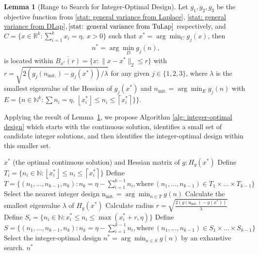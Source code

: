 \documentclass{article}
\theoremstyle{definition}
\newtheorem{lemma}[theorem]{Lemma}
\begin{document}
\begin{lemma}[Range to Search for Integer-Optimal Design] \label{lemma: range to search}
    Let $g_1, g_2, g_3$ be the objective function  from \eqref{stat: general variance from Laplace}, \eqref{stat: general variance from DLap}$, \eqref{stat: general variance from TuLap}$ respectively, and $C = \{ x \in \mathbb{R}^k: \sum_{i=1}^k x_i = \eta, \ x>0\}$ such that $x^* = \arg \min_C g_j (x)$, then
    \begin{align} \label{eq: integer-optimal design}
        n^* = \arg \min_D g_j (n),
    \end{align}
    is located within $\overline{{B_{x^*}(r)}} = \{ x: \|x-x^*\|_2 \leq r \}$ with $r=\sqrt{2 (g_j (n_{\text{init.}}) - g_j (x^*))/\lambda}$ for any given $j \in \{1,2,3\}$, where $\lambda$ is the smallest eigenvalue of the Hessian of $g_j(x^*)$ and $n_{\text{init.}} = \arg \min_{E} g_j(n)$ with   $E = \{ n \in \mathbb{N}^k : \sum n_i = \eta, \ \left\lfloor x_i^*  \right\rfloor \leq n_i \leq \left\lceil x_i^* \right\rceil \}\}$.
\end{lemma}

Applying the result of Lemma~\ref{lemma: range to search}, we propose Algorithm \ref{alg: integer-optimal design} which starts with the continuous solution, identifies a small set of candidate integer solutions, and then identifies the integer-optimal design within this smaller set.

\algrenewcommand{}
\algrenewcommand{}

\begin{algorithm}
\caption{Integer-Optimal Design} \label{alg: integer-optimal design}
\begin{algorithmic}
\Require $x^*$ (the optimal continuous solution) and Hessian matrix of $g: H_g (x^*)$
        \State Define $T_i = \{ n_i \in \mathbb{N}: \left\lfloor x_i^*  \right\rfloor \leq n_i \leq \left\lceil x_i^* \right\rceil \}$
    \EndFor
    \State Define $T = \{ (n_1,...,n_{k-1}, n_k): n_k = \eta - \sum_{i=1}^{k-1} n_i, \text{where} \ (n_1,...,n_{k-1}) \in T_1 \times ... \times T_{k-1}  \}$
    \State Select the nearest integer design $\mathrm{n}_{\text{init.}} = \arg \min_{n \in T} g(n)$
    \State Calculate the smallest eigenvalue $\lambda$ of $H_g (x^*)$
    \State Calculate radius $r = \sqrt{\frac{2 (g(\mathrm{n}_{\text{init.}}) - g(x^*))}{\lambda}}$
        \State Define $S_i = \{ n_i \in \mathbb{N}: x_i^* \leq n_i \leq \max (x_i^* + r, \eta) \}$
    \EndFor
    \State Define $S = \{ (n_1,...,n_{k-1}, n_k): n_k = \eta - \sum_{i=1}^{k-1} n_i, \text{where} \ (n_1,...,n_{k-1}) \in S_1 \times ... \times S_{k-1}  \}$
    \State Select the integer-optimal design $n^* = \arg \min_{n \in S} g(n)$ by an exhaustive search.
\Ensure $n^*$ 
\end{algorithmic}
\end{algorithm}
\end{document}
